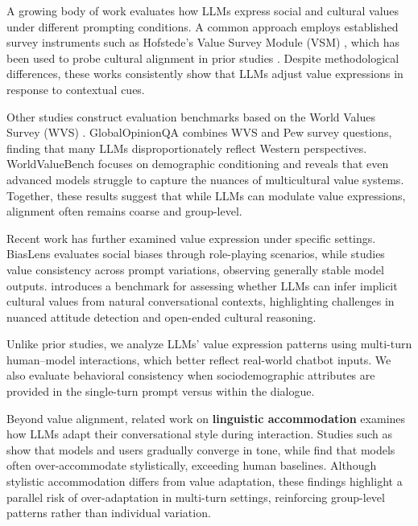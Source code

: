 \documentclass[acmlarge]{acmart}
\begin{document}
A growing body of work evaluates how LLMs express social and cultural values under different prompting conditions. A common approach employs established survey instruments such as Hofstede's Value Survey Module (VSM) \citep{vsm2013-jj}, which has been used to probe cultural alignment in prior studies \citep{kharchenko2024llmsrepresentvaluescultures, arora2023probing, masoud-etal-2025-cultural}. Despite methodological differences, these works consistently show that LLMs adjust value expressions in response to contextual cues.

Other studies construct evaluation benchmarks based on the World Values Survey (WVS) \citep{Haerpfer2020-qe}. GlobalOpinionQA \citep{durmus2024towards} combines WVS and Pew survey questions, finding that many LLMs disproportionately reflect Western perspectives. WorldValueBench \citep{zhao2024worldvaluesbenchlargescalebenchmarkdataset} focuses on demographic conditioning and reveals that even advanced models struggle to capture the nuances of multicultural value systems. Together, these results suggest that while LLMs can modulate value expressions, alignment often remains coarse and group-level.

Recent work has further examined value expression under specific settings. BiasLens \citep{li2024benchmarkingbiaslargelanguage} evaluates social biases through role-playing scenarios, while \cite{moore-etal-2024-large} studies value consistency across prompt variations, observing generally stable model outputs. \cite{liu2025llmsgraspimplicitcultural} introduces a benchmark for assessing whether LLMs can infer implicit cultural values from natural conversational contexts, highlighting challenges in nuanced attitude detection and open-ended cultural reasoning.


Unlike prior studies, we analyze LLMs' value expression patterns using multi-turn human--model interactions, which better reflect real-world chatbot inputs. We also evaluate behavioral consistency when sociodemographic attributes are provided in the single-turn prompt versus within the dialogue.


Beyond value alignment, related work on \textbf{linguistic accommodation} examines how LLMs adapt their conversational style during interaction. Studies such as \cite{Chang_Wang_2025} show that models and users gradually converge in tone, while \cite{blevins2025languagemodelsaccommodateusers} find that models often over-accommodate stylistically, exceeding human baselines. Although stylistic accommodation differs from value adaptation, these findings highlight a parallel risk of over-adaptation in multi-turn settings, reinforcing group-level patterns rather than individual variation.
\end{document}
